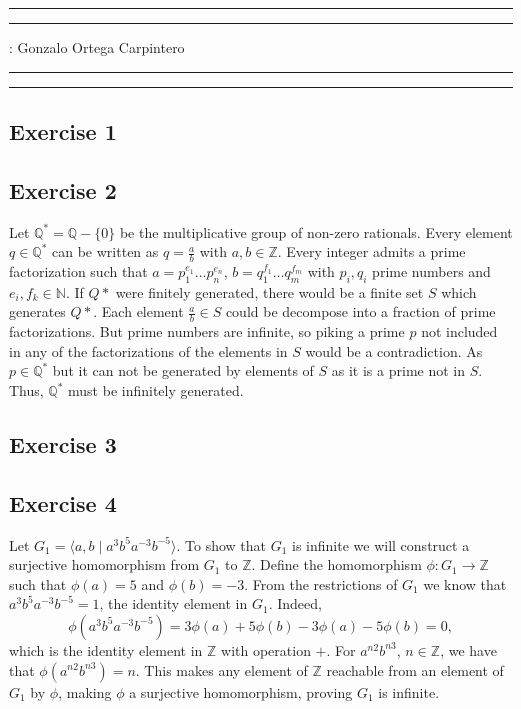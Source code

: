 \documentclass[11pt,a4paper]{article}
\newcommand{\Z}{\mathbb Z}
\newcommand{\Q}{\mathbb Q}
\newcommand{\N}{\mathbb N}
\begin{document}
\hrule\hrule
\vspace{1mm}


\vspace{1mm}

 : Gonzalo Ortega Carpintero
\vspace{2mm}

\hrule\hrule

\subsection*{Exercise 1}

\subsection*{Exercise 2}
Let $ \Q^* = \Q - \{0\} $ be the multiplicative group of non-zero rationals. Every element $ q \in \Q^* $ can be written as $ q = \frac{a}{b} $ with $ a, b \in \Z $. Every integer admits a prime factorization such that $ a = p_1^{e_1} \dots p_n^{e_n} $, $ b = q_1^{f_1} \dots q_m^{f_m} $ with $p_i, q_i $ prime numbers and $ e_i, f_k \in \N$. If $Q*$ were finitely generated, there would be a finite set $ S $ which generates $Q*$. Each element  $ \frac{a}{b} \in S $ could be decompose into a fraction of prime factorizations. But prime numbers are infinite, so piking a prime $ p $ not included in any of the factorizations of the elements in $ S $ would be a contradiction. As $ p \in \Q^*$ but it can not be generated by elements of $ S $ as it is a prime not in $ S $. Thus, $ \Q^*$ must be infinitely generated.

\subsection*{Exercise 3}

\subsection*{Exercise 4}
Let $ G_1 = \langle a, b \mid a^3 b^5 a^{-3} b^{-5} \rangle $. To show that $ G_1 $ is infinite we will construct a surjective homomorphism from $ G_1 $ to $ \Z $. Define the homomorphism $ \phi \colon G_1  \to \Z $ such that $ \phi(a) = 5 $ and $ \phi(b) = -3 $. From the restrictions of $ G_1 $ we know that $ a^3 b^5 a^{-3} b^{-5} = 1 $, the identity element in $ G_1 $. Indeed,
$$
  \phi (a^3 b^5 a^{-3} b^{-5}) = 3\phi(a) + 5\phi(b) - 3 \phi(a) - 5 \phi(b) = 0,
$$
which is the identity element in $ \Z $ with operation $ + $. For $ a^{n2} b^{n3} $, $ n \in \Z $, we have that $ \phi(a^{n2} b^{n3}) = n $. This makes any element of $ \Z$ reachable from an element of $ G_1 $ by $ \phi $, making $ \phi $ a surjective homomorphism, proving $ G_1 $ is infinite.
\end{document}
